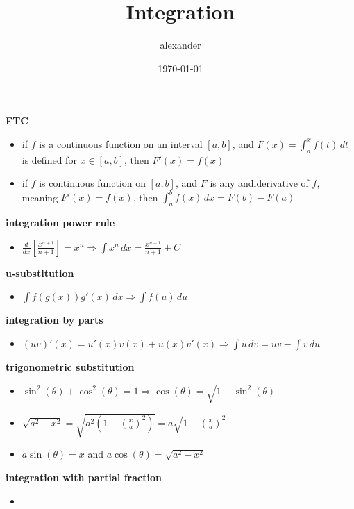 \documentclass{article}
\title{Integration}
\author{alexander}
\date{\today}
\begin{document}
\maketitle

\textbf{FTC}
	\begin{itemize}
		\item if $f$ is a continuous function on an interval $[a, b]$, and $F(x) = \int_{a}^{x}f(t)\,dt$ is defined for $x \in [a, b]$, then $F'(x) = f(x)$
		\item if $f$ is continuous function on $[a, b]$, and $F$ is any andiderivative of $f$, meaning $F'(x) = f(x)$, then $\int_{a}^{b}f(x)\,dx = F(b) - F(a)$
	\end{itemize}

\textbf{integration power rule}
        \begin{itemize}
                \item $\frac{d}{dx}[\frac{x^{n+1}}{n+1}] = x^n \Rightarrow \int x^n\,dx = \frac{x^{n+1}}{n+1} + C$
        \end{itemize}
                
\textbf{u-substitution}
        \begin{itemize}
                \item $\int f(g(x))g'(x)\,dx \Rightarrow \int f(u)\,du$
        \end{itemize}
                
\textbf{integration by parts}
        \begin{itemize}
                \item $(uv)'(x) = u'(x)v(x) + u(x)v'(x) \Rightarrow \int u\,dv = uv - \int v\,du$
        \end{itemize}

\textbf{trigonometric substitution}
	\begin{itemize}
		\item $\sin^2(\theta) + \cos^2(\theta) = 1 \Rightarrow \cos(\theta) = \sqrt{1 - \sin^2(\theta)}$
		\item $\sqrt{a^2 - x^2} = \sqrt{a^2(1 - (\frac{x}{a})^2)} = a\sqrt{1 - (\frac{x}{a})^2}$
		\item $a\sin(\theta) = x$ and $a\cos(\theta) = \sqrt{a^2 - x^2}$
	\end{itemize}

\textbf{integration with partial fraction}
	\begin{itemize}
		\item
	\end{itemize}
\end{document}
